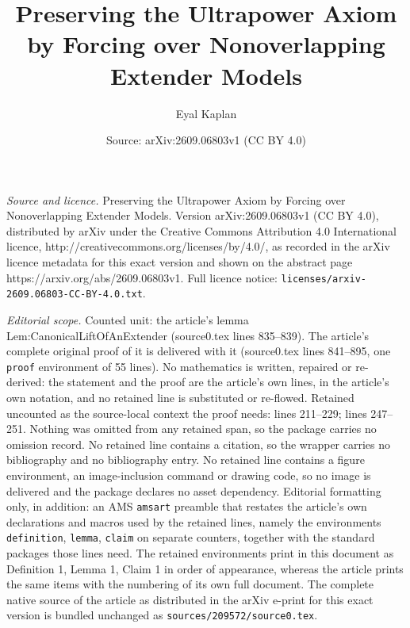 \documentclass[10pt,a4paper]{amsart}
\title{Preserving the Ultrapower Axiom by Forcing over Nonoverlapping Extender Models}
\author{Eyal Kaplan}
\date{Source: arXiv:2609.06803v1 (CC BY 4.0)}
\begin{document}
\maketitle

\noindent\emph{Source and licence.} Preserving the Ultrapower Axiom by Forcing over Nonoverlapping Extender Models. Version arXiv:2609.06803v1 (CC BY 4.0), distributed by arXiv under the Creative Commons Attribution 4.0 International licence, http://creativecommons.org/licenses/by/4.0/, as recorded in the arXiv licence metadata for this exact version and shown on the abstract page https://arxiv.org/abs/2609.06803v1. Full licence notice: \texttt{licenses/arxiv-2609.06803-CC-BY-4.0.txt}.\par\smallskip

\noindent\textit{Editorial scope.} Counted unit: the article's lemma Lem:CanonicalLiftOfAnExtender (source0.tex lines 835--839). The article's complete original proof of it is delivered with it (source0.tex lines 841--895, one \texttt{proof} environment of 55 lines). No mathematics is written, repaired or re-derived: the statement and the proof are the article's own lines, in the article's own notation, and no retained line is substituted or re-flowed.  Retained uncounted as the source-local context the proof needs: lines 211--229; lines 247--251.  Nothing was omitted from any retained span, so the package carries no omission record.  No retained line contains a citation, so the wrapper carries no bibliography and no bibliography entry.  No retained line contains a figure environment, an image-inclusion command or drawing code, so no image is delivered and the package declares no asset dependency.  Editorial formatting only, in addition: an AMS \texttt{amsart} preamble that restates the article's own declarations and macros used by the retained lines, namely the environments \texttt{definition}, \texttt{lemma}, \texttt{claim} on separate counters, together with the standard packages those lines need.  The retained environments print in this document as Definition 1, Lemma 1, Claim 1 in order of appearance, whereas the article prints the same items with the numbering of its own full document.  The complete native source of the article as distributed in the arXiv e-print for this exact version is bundled unchanged as \texttt{sources/209572/source0.tex}.
\end{document}
